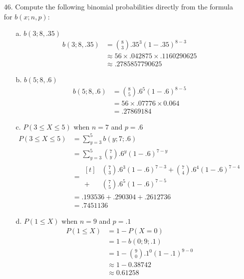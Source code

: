 \documentclass[letterpaper,12pt]{article}
\newcommand{\bp}[3]{%
  \binom{#2}{#1}#3^{#1}(1 - #3)^{#2 - #1}%
}
\begin{document}
\maketitle

\begin{enumerate}
  \item[46.]
    Compute the following binomial probabilities directly from the formula for $b(x; n, p)$:
    \begin{enumerate}
      \item[a.]
        $b(3; 8, .35)$
        \begin{align*}
          b(3; 8, .35) &= \bp{3}{8}{.35} \\
          &\approx 56 \times .042875 \times .1160290625 \\
          &\approx .2785857790625
        \end{align*}
      \item[b.]
        $b(5; 8, .6)$
        \begin{align*}
          b(5; 8, .6) &= \bp{5}{8}{.6}  \\
          &= 56 \times .07776 \times 0.064 \\
          &= .27869184
        \end{align*}
      \item[c.]
        $P(3 \le X \le 5)$ when $n = 7$ and $p = .6$
        \begin{align*}
          P(3 \le X \le 5) &= \sum_{y = 3}^5 b(y; 7; .6) \\
          &= \sum_{y = 3}^5 \bp{y}{7}{.6}  \\
          &= \begin{aligned}[t]
              &\bp{3}{7}{.6} + \bp{4}{7}{.6}  \\
            + &\bp{5}{7}{.6}
          \end{aligned} \\
          &= .193536 + .290304 + .2612736 \\
          &= .7451136
        \end{align*}
      \item[d.]
        $P(1 \le X)$ when $n = 9$ and $p = .1$
        \begin{align*}
          P(1 \le X) &= 1 - P(X = 0) \\
          &= 1 - b(0; 9; .1) \\
          &= 1 - \bp{0}{9}{.1} \\
          &\approx 1 - 0.38742 \\
          &\approx 0.61258

\end{align*}
\end{enumerate}
\end{enumerate}
\end{document}

